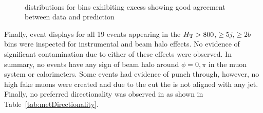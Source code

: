 \begin{figure}[tbhp]
    \caption{\mht distributions for bins exhibiting excess showing good agreement between data and prediction}
      \label{fig:mhtDistributionExcessBins}
  \begin{center}
     ~~
  \end{center}
\end{figure}

Finally, event displays for all 19 events appearing in the $\mbox{$H_\text{T}$} > 800$,$\geq5j$,$\ge2b$ bins
were inspected for instrumental and beam halo effects. No evidence of significant contamination
due to either of these effects were observed. In summary, no events have any sign of beam halo
around $\phi = 0,\pi$ in the muon system or calorimeters. Some events had evidence of punch 
through, however, no high \pt fake muons were created and due to the \bdphi cut the \met is
not aligned with any jet. Finally, no preferred directionality was observed in \met as shown
in Table~\ref{tab:metDirectionality}.

